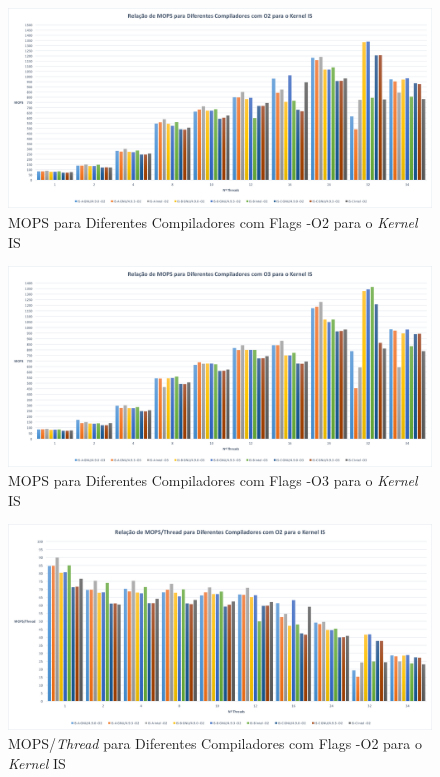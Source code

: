 \documentclass[conference,compsoc]{IEEEtran}
\begin{document}
\begin{figure}[h!]
\centering
\includegraphics[scale=0.225]{OMP/mops_dif_comp-O2_IS_nodo-641.png}
\caption{MOPS para Diferentes Compiladores com Flags -O2 para o \textit{Kernel} IS}
\end{figure}

\begin{figure}[h!]
\centering
\includegraphics[scale=0.225]{OMP/mops_dif_comp-O3_IS_nodo-641.png}
\caption{MOPS para Diferentes Compiladores com Flags -O3 para o \textit{Kernel} IS}
\end{figure}

\begin{figure}[h!]
\centering
\includegraphics[scale=0.225]{OMP/mops-thread_dif_comp-O2_IS_nodo-641.png}
\caption{MOPS/\textit{Thread} para Diferentes Compiladores com Flags -O2 para o \textit{Kernel} IS}
\end{figure}
\end{document}
